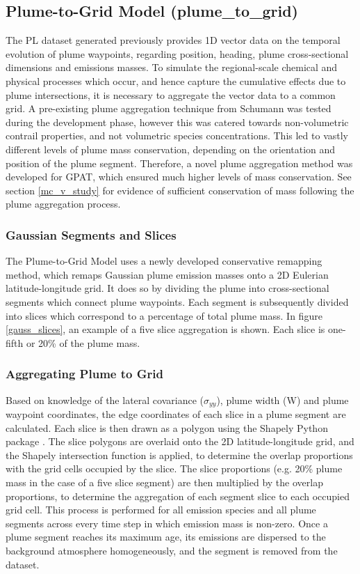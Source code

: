 \subsection{Plume-to-Grid Model (plume\_to\_grid)}
\label{plume_to_grid_model_section}
The PL dataset generated previously provides 1D vector data on the temporal evolution of plume waypoints, regarding position, heading, plume cross-sectional dimensions and emissions masses. To simulate the regional-scale chemical and physical processes which occur, and hence capture the cumulative effects due to plume intersections, it is necessary to aggregate the vector data to a common grid. A pre-existing plume aggregation technique from Schumann \cite{Schumann2012a} was tested during the development phase, however this was catered towards non-volumetric contrail properties, and not volumetric species concentrations. This led to vastly different levels of plume mass conservation, depending on the orientation and position of the plume segment. Therefore, a novel plume aggregation method was developed for GPAT, which ensured much higher levels of mass conservation. See section \ref{mc_v_study} for evidence of sufficient conservation of mass following the plume aggregation process.

\subsubsection{Gaussian Segments and Slices}
The Plume-to-Grid Model uses a newly developed conservative remapping method, which remaps Gaussian plume emission masses onto a 2D Eulerian latitude-longitude grid. It does so by dividing the plume into cross-sectional segments which connect plume waypoints. Each segment is subsequently divided into slices which correspond to a percentage of total plume mass. In figure \ref{gauss_slices}, an example of a five slice aggregation is shown. Each slice is one-fifth or 20\% of the plume mass.

\subsubsection{Aggregating Plume to Grid}
Based on knowledge of the lateral covariance ($\sigma_{yy}$), plume width (W) and plume waypoint coordinates, the edge coordinates of each slice in a plume segment are calculated. Each slice is then drawn as a polygon using the Shapely Python package \cite{Shapely2024}. The slice polygons are overlaid onto the 2D latitude-longitude grid, and the Shapely intersection function is applied, to determine the overlap proportions with the grid cells occupied by the slice. The slice proportions (e.g. 20\% plume mass in the case of a five slice segment) are then multiplied by the overlap proportions, to determine the aggregation of each segment slice to each occupied grid cell. This process is performed for all emission species and all plume segments across every time step in which emission mass is non-zero. Once a plume segment reaches its maximum age, its emissions are dispersed to the background atmosphere homogeneously, and the segment is removed from the dataset. 


